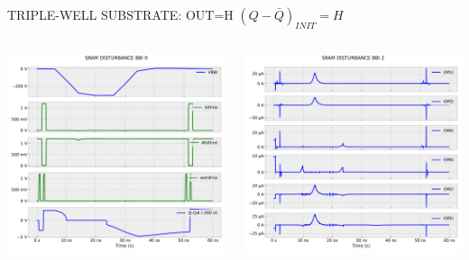 
\begin{frame}{TRIPLE-WELL SUBSTRATE: OUT=H}
	\vspace{5mm}
	$(Q-\bar{Q})_{INIT}=H$
	\vspace{5mm}
	\begin{columns}
		\begin{column}{0.5\textwidth}
			\centering
			\includegraphics[width=\textwidth]{./figures/SRAMBBI0-300TW.pdf}
		\end{column}
		\begin{column}{0.5\textwidth}
			\centering
			\includegraphics[width=\textwidth]{./figures/SRAMBBI2-300TW.pdf}
		\end{column}
	\end{columns}
\end{frame}
